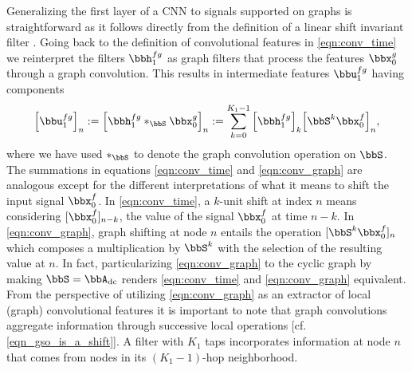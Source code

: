 

Generalizing the first layer of a CNN to signals supported on graphs is straightforward as it follows directly from the definition of a linear shift invariant filter \cite{segarra17-linear}. Going back to the definition of convolutional features in \eqref{eqn:conv_time} we reinterpret the filters $\bbh_{1}^{fg}$ as graph filters that process the features $\bbx_0^g$ through a graph convolution. This results in intermediate features $\bbu_{1}^{fg}$ having components 
% 
\begin{equation} \label{eqn:conv_graph}
   \Big[\bbu_{1}^{fg}\Big]_n
      := \Big[\bbh_{1}^{fg} \ast_\bbS \bbx_0^g \Big]_{n} 
      := \sum_{k=0}^{K_1-1} 
             \Big[ \bbh_{1}^{fg} \Big]_{k} 
             \Big[ \bbS^{k} \bbx_{0}^{f}\Big]_{n},
\end{equation}
where we have used $\ast_\bbS$ to denote the graph convolution operation on $\bbS$. The summations in equations \eqref{eqn:conv_time} and \eqref{eqn:conv_graph} are analogous except for the different interpretations of what it means to shift the input signal $\bbx_{0}^{f}$. In \eqref{eqn:conv_time}, a $k$-unit shift at index $n$ means considering $[\bbx_{0}^{f}]_{n-k}$, the value of the signal $\bbx_{0}^{f}$ at time $n-k$. In \eqref{eqn:conv_graph}, graph shifting at node $n$ entails the operation $[ \bbS^{k} \bbx_{0}^{f}]_{n}$ which composes a multiplication by $\bbS^k$ with the selection of the resulting value at $n$. In fact, particularizing \eqref{eqn:conv_graph} to the cyclic graph by making $\bbS=\bbA_{\dc}$ renders \eqref{eqn:conv_time} and \eqref{eqn:conv_graph} equivalent. From the perspective of utilizing \eqref{eqn:conv_graph} as an extractor of local (graph) convolutional features it is important to note that graph convolutions aggregate information through successive local operations [cf. \eqref{eqn_gso_is_a_shift}]. A filter with $K_1$ taps incorporates information at node $n$ that comes from nodes in its $(K_1-1)$-hop neighborhood.

